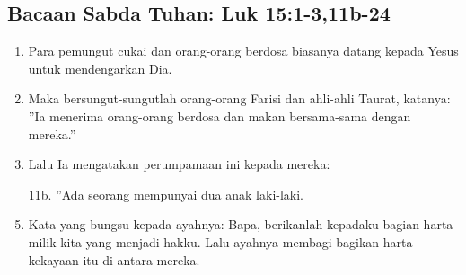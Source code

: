 \documentclass[a5paper,headsepline,titlepage,11pt,nnormalheadings,DIVcalc]{scrbook}
\begin{document}
\subsection*{Bacaan Sabda Tuhan: Luk 15:1-3,11b-24}
\begin{enumerate}
\item Para pemungut cukai dan orang-orang berdosa biasanya datang
kepada Yesus untuk mendengarkan Dia.
\item Maka bersungut-sungutlah orang-orang Farisi dan ahli-ahli Taurat,
katanya: ”Ia menerima orang-orang berdosa dan makan bersama-sama
dengan mereka.”
\item Lalu Ia mengatakan perumpamaan ini kepada mereka:
\setcounter{enumi}{11}
\item[11b.] ”Ada seorang mempunyai dua anak laki-laki.
\item Kata yang bungsu kepada ayahnya: Bapa, berikanlah kepadaku
bagian harta milik kita yang menjadi hakku. Lalu ayahnya
membagi-bagikan harta kekayaan itu di antara mereka.

\end{enumerate}
\end{document}
